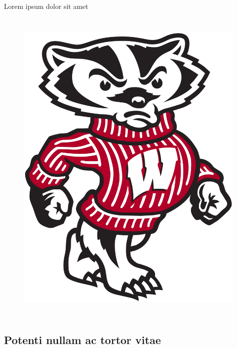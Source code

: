 \begin{frame}{Lorem ipsum dolor sit amet}
\begin{columns}
\begin{figure}
    \includegraphics[width=\linewidth]{images/BuckyBadger.png}
    \label{fig:cyclus_ecosystem}
\end{figure}
\end{columns}
\end{frame}

\subsection{Potenti nullam ac tortor vitae}

